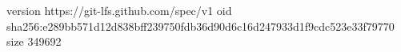 version https://git-lfs.github.com/spec/v1
oid sha256:e289bb571d12d838bff239750fdb36d90d6c16d247933d1f9cdc523e33f79770
size 349692
